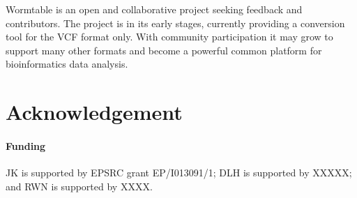 \documentclass{bioinfo}
\begin{document}
Wormtable is an open and collaborative project seeking feedback and 
contributors. The project is in its early stages, currently 
providing a conversion tool for the VCF format only. With community
participation it may grow to support many other formats and become
a powerful common platform for bioinformatics data analysis.

\section*{Acknowledgement}
\paragraph{Funding\textcolon}  
JK is supported by EPSRC grant EP/I013091/1; DLH is supported by XXXXX; 
and RWN is supported by XXXX.



\end{document}
